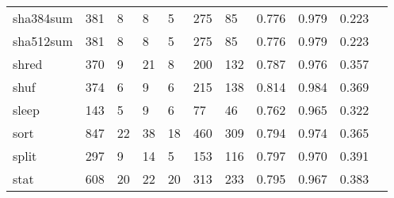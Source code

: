 \begin{longtable}{lp{1.10cm}p{1.10cm}p{1.10cm}p{1.10cm}p{1.10cm}p{1.10cm}p{1.10cm}p{1.10cm}p{1.10cm}p{1.10cm}}
sha384sum &                    381 &                                  8 &                                 8 &                                5 &                               275 &                              85 &                             0.776 &                                 0.979 &                               0.223 \\
sha512sum &                    381 &                                  8 &                                 8 &                                5 &                               275 &                              85 &                             0.776 &                                 0.979 &                               0.223 \\
shred     &                    370 &                                  9 &                                21 &                                8 &                               200 &                             132 &                             0.787 &                                 0.976 &                               0.357 \\
shuf      &                    374 &                                  6 &                                 9 &                                6 &                               215 &                             138 &                             0.814 &                                 0.984 &                               0.369 \\
sleep     &                    143 &                                  5 &                                 9 &                                6 &                                77 &                              46 &                             0.762 &                                 0.965 &                               0.322 \\
sort      &                    847 &                                 22 &                                38 &                               18 &                               460 &                             309 &                             0.794 &                                 0.974 &                               0.365 \\
split     &                    297 &                                  9 &                                14 &                                5 &                               153 &                             116 &                             0.797 &                                 0.970 &                               0.391 \\
stat      &                    608 &                                 20 &                                22 &                               20 &                               313 &                             233 &                             0.795 &                                 0.967 &                               0.383 \\

\end{longtable}
